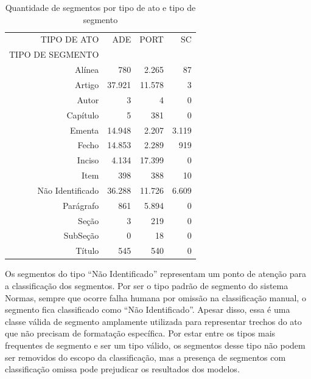\begin{table}[h] 
\caption{Quantidade de segmentos por tipo de ato e tipo de segmento}
\label{tab:segmentos-por-tipo}
	\begin{center} 

		\begin{tabular}{rrrr}
		\toprule
		TIPO DE ATO &      ADE    &   PORT &      SC \\
		TIPO DE SEGMENTO          &        &         \\
		\midrule
		Alínea           &    780 &  2.265 &      87 \\
		Artigo           & 37.921 & 11.578 &       3 \\
		Autor            &      3 &      4 &       0 \\
		Capítulo         &      5 &    381 &       0 \\
		Ementa           & 14.948 &  2.207 &   3.119 \\
		Fecho            & 14.853 &  2.289 &     919 \\
		Inciso           &  4.134 & 17.399 &       0 \\
		Item             &    398 &    388 &      10 \\
		Não Identificado & 36.288 & 11.726 &   6.609 \\
		Parágrafo        &    861 &  5.894 &       0 \\
		Seção            &      3 &    219 &       0 \\
		SubSeção         &      0 &     18 &       0 \\
		Título           &    545 &    540 &       0 \\
		\bottomrule
	\end{tabular}
	\end{center}
	\fdp
\end{table} 

Os segmentos do tipo ``Não Identificado'' representam um ponto de atenção para a classificação dos segmentos. Por ser o tipo padrão de segmento do sistema Normas, sempre que ocorre falha humana por omissão na classificação manual, o segmento fica classificado como ``Não Identificado''. Apesar disso, essa é uma classe válida de segmento amplamente utilizada para representar trechos do ato que não precisam de formatação específica. Por estar entre os tipos mais frequentes de segmento e ser um tipo válido, os segmentos desse tipo não podem ser removidos do escopo da classificação, mas a presença de segmentos com classificação omissa pode prejudicar os resultados dos modelos.

